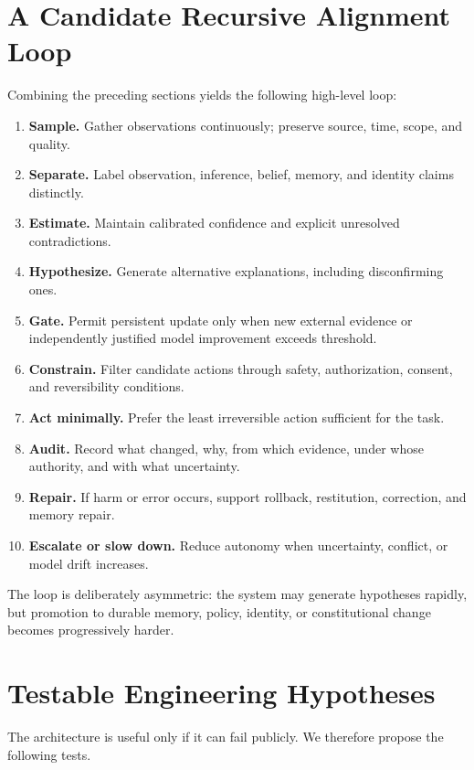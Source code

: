 \documentclass[11pt]{article}
\begin{document}
\section{A Candidate Recursive Alignment Loop}

Combining the preceding sections yields the following high-level loop:

\begin{enumerate}
    \item \textbf{Sample.} Gather observations continuously; preserve source, time, scope, and quality.
    \item \textbf{Separate.} Label observation, inference, belief, memory, and identity claims distinctly.
    \item \textbf{Estimate.} Maintain calibrated confidence and explicit unresolved contradictions.
    \item \textbf{Hypothesize.} Generate alternative explanations, including disconfirming ones.
    \item \textbf{Gate.} Permit persistent update only when new external evidence or independently justified model improvement exceeds threshold.
    \item \textbf{Constrain.} Filter candidate actions through safety, authorization, consent, and reversibility conditions.
    \item \textbf{Act minimally.} Prefer the least irreversible action sufficient for the task.
    \item \textbf{Audit.} Record what changed, why, from which evidence, under whose authority, and with what uncertainty.
    \item \textbf{Repair.} If harm or error occurs, support rollback, restitution, correction, and memory repair.
    \item \textbf{Escalate or slow down.} Reduce autonomy when uncertainty, conflict, or model drift increases.
\end{enumerate}

The loop is deliberately asymmetric: the system may generate hypotheses rapidly, but promotion to durable memory, policy, identity, or constitutional change becomes progressively harder.

\section{Testable Engineering Hypotheses}

The architecture is useful only if it can fail publicly. We therefore propose the following tests.
\end{document}
